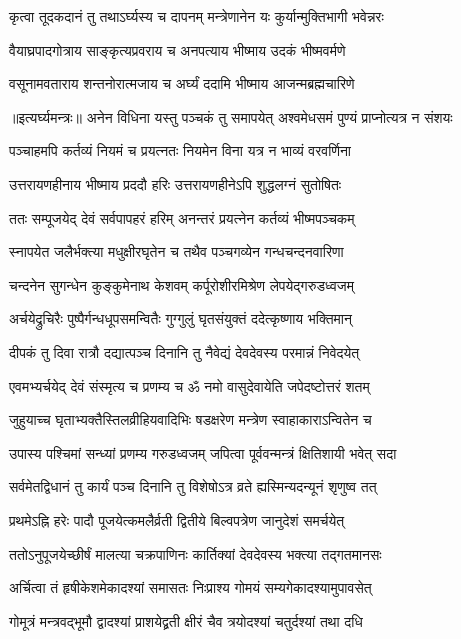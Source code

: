 \twolineshloka
{कृत्वा तूदकदानं तु तथाऽर्घ्यस्य च दापनम्}
{मन्त्रेणानेन यः कुर्यान्मुक्तिभागी भवेन्नरः} %

\twolineshloka
{वैयाघ्रपादगोत्राय साङ्कृत्यप्रवराय च}
{अनपत्याय भीष्माय उदकं भीष्मवर्मणे} %

\twolineshloka
{वसूनामवताराय शन्तनोरात्मजाय च}
{अर्घ्यं ददामि भीष्माय आजन्मब्रह्मचारिणे} %


॥इत्यर्घ्यमन्त्रः॥
\twolineshloka
{अनेन विधिना यस्तु पञ्चकं तु समापयेत्}
{अश्वमेधसमं पुण्यं प्राप्नोत्यत्र न संशयः} %

\twolineshloka
{पञ्चाहमपि कर्तव्यं नियमं च प्रयत्नतः}
{नियमेन विना यत्र न भाव्यं वरवर्णिना} %

\twolineshloka
{उत्तरायणहीनाय भीष्माय प्रददौ हरिः}
{उत्तरायणहीनेऽपि शुद्धलग्नं सुतोषितः} %

\twolineshloka
{ततः सम्पूजयेद् देवं सर्वपापहरं हरिम्}
{अनन्तरं प्रयत्नेन कर्तव्यं भीष्मपञ्चकम्} %

\twolineshloka
{स्नापयेत जलैर्भक्त्या मधुक्षीरघृतेन च}
{तथैव पञ्चगव्येन गन्धचन्दनवारिणा} %

\twolineshloka
{चन्दनेन सुगन्धेन कुङ्कुमेनाथ केशवम्}
{कर्पूरोशीरमिश्रेण लेपयेद्गरुडध्वजम्} %

\twolineshloka
{अर्चयेद्रुचिरैः पुष्पैर्गन्धधूपसमन्वितैः}
{गुग्गुलुं घृतसंयुक्तं ददेत्कृष्णाय भक्तिमान्} %

\twolineshloka
{दीपकं तु दिवा रात्रौ दद्यात्पञ्च दिनानि तु}
{नैवेद्यं देवदेवस्य परमान्नं निवेदयेत्} %

\twolineshloka
{एवमभ्यर्चयेद् देवं संस्मृत्य च प्रणम्य च}
{ॐ नमो वासुदेवायेति जपेदष्टोत्तरं शतम्} %

\twolineshloka
{जुहुयाच्च घृताभ्यक्तैस्तिलव्रीहियवादिभिः}
{षडक्षरेण मन्त्रेण स्वाहाकाराऽन्वितेन च} %

\twolineshloka
{उपास्य पश्चिमां सन्ध्यां प्रणम्य गरुडध्वजम्}
{जपित्वा पूर्ववन्मन्त्रं क्षितिशायी भवेत् सदा} %

\twolineshloka
{सर्वमेतद्विधानं तु कार्यं पञ्च दिनानि तु}
{विशेषोऽत्र व्रते ह्यस्मिन्यदन्यूनं शृणुष्व तत्} %

\twolineshloka
{प्रथमेऽह्नि हरेः पादौ पूजयेत्कमलैर्व्रती}
{द्वितीये बिल्वपत्रेण जानुदेशं समर्चयेत्} %

\twolineshloka
{ततोऽनुपूजयेच्छीर्षं मालत्या चक्रपाणिनः}
{कार्तिक्यां देवदेवस्य भक्त्या तद्गतमानसः} %

\twolineshloka
{अर्चित्वा तं हृषीकेशमेकादश्यां समासतः}
{निःप्राश्य गोमयं सम्यगेकादश्यामुपावसेत्} %

\twolineshloka
{गोमूत्रं मन्त्रवद्भूमौ द्वादश्यां प्राशयेद्व्रती}
{क्षीरं चैव त्रयोदश्यां चतुर्दश्यां तथा दधि} %


